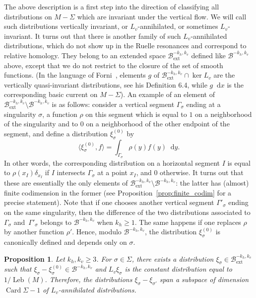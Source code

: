 \documentclass[JEP,XML,SOM,Unicode]{cedram}
\newcommand{\ext}{\mathrm{ext}}
\newcommand{\boB}{\mathcal{B}}
\newcommand{\dd}{\mathop{}\!\mathrm{d}}
\DeclareMathOperator{\Card}{Card}
\DeclareMathOperator{\Leb}{Leb}
\newtheorem{prop}[thm]{Proposition}
\theoremstyle{definition}
\numberwithin{equation}{section}
\begin{document}
The above description is a first step into the direction of classifying all
distributions on $M-\Sigma$ which are invariant under the vertical flow. We
will call such distributions vertically invariant, or $L_v$\nobreakdash-annihilated, or
sometimes $L_v$-invariant. It turns out that there is another family of such
$L_v$\nobreakdash-annihilated distributions, which do not show up in the Ruelle
resonances and correspond to relative homology. They belong to an extended
space $\boB^{-k_h, k_v}_{\ext}$ defined like $\boB^{-k_h, k_v}$ above, except
that we do not restrict to the closure of the set of smooth functions. (In
the language of Forni~\cite{forni_deviation}, elements $g$ of
$\boB_{\ext}^{-k_h, k_v} \cap \ker L_v$ are the vertically quasi-invariant
distributions, see his Definition 6.4, while $g\dd x$ is the corresponding
basic current on $M-\Sigma$). \label{page_B_ext_not_B} An example of an element of $\boB_{\ext}^{-k_h,
k_v}\setminus \boB^{-k_h, k_v}$ is as follows: consider a vertical segment
$\Gamma_\sigma$ ending at a singularity $\sigma$, a function $\rho$ on this
segment which is equal to $1$ on a neighborhood of the singularity and to $0$
on a neighborhood of the other endpoint of the segment, and define a
distribution $\xi_\sigma^{(0)}$ by
\[
\langle \xi_\sigma^{(0)}, f\rangle =
\int_{\Gamma_\sigma} \rho(y) f(y)\dd y.
\]
In other words, the corresponding
distribution on a horizontal segment $I$ is equal to $\rho(x_I) \delta_{x_I}$
if $I$ intersects $\Gamma_\sigma$ at a point $x_I$, and $0$ otherwise. It
turns out that these are essentially the only elements of $\boB_{\ext}^{-k_h,
k_v}\setminus \boB^{-k_h, k_v}$: the latter has (almost) finite codimension
in the former (see Proposition~\ref{prop:finite_codim} for a precise
statement). Note that if one chooses another vertical segment
$\Gamma'_\sigma$ ending on the same singularity, then the difference of the
two distributions associated to~$\Gamma_\sigma$ and~$\Gamma'_\sigma$ belongs
to $\boB^{-k_h, k_v}$ when $k_h \geq 1$. The same happens if one replaces
$\rho$ by another function $\rho'$. Hence, modulo $\boB^{-k_h, k_v}$, the
distribution $\xi_\sigma^{(0)}$ is canonically defined and depends only on
$\sigma$.

\begin{prop}
\label{prop:spurious_distributions} Let $k_h, k_v\geq 3$. For $\sigma \in
\Sigma$, there exists a distribution $\xi_\sigma \in \boB_{\ext}^{-k_h, k_v}$
such that $\xi_\sigma - \xi_\sigma^{(0)} \in \boB^{-k_h, k_v}$ and $L_v
\xi_\sigma$ is the constant distribution equal to $1/\Leb(M)$. Therefore, the
distributions $\xi_\sigma- \xi_{\sigma'}$ span a subspace of dimension $\Card
\Sigma- 1$ of $L_v$-annihilated distributions.
\end{prop}
\end{document}

